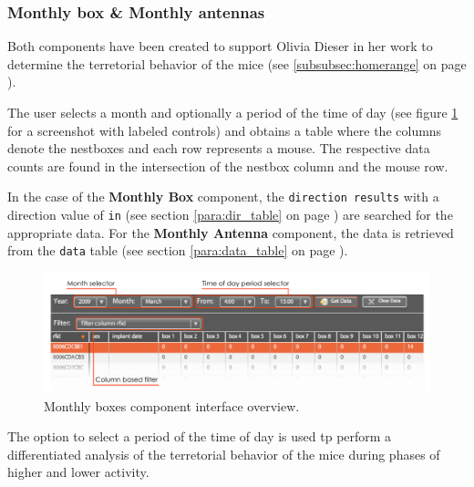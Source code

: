 \subsubsection{Monthly box \& Monthly antennas}
\label{subsubsec:monthbox}

Both components have been created to support Olivia Dieser in her work to determine the terretorial behavior of the mice (see \ref{subsubsec:homerange} on page \pageref{subsubsec:homerange}).

The user selects a month and optionally a period of the time of day (see figure \ref{fig:month_box_ant} for a screenshot with labeled controls) and obtains a table where the columns denote the nestboxes and each row represents a mouse. The respective data counts are found in the intersection of the nestbox column and the mouse row.

In the case of the \textbf{Monthly Box} component, the \lstinline|direction results| with a direction value of \lstinline|in| (see section \ref{para:dir_table} on page \pageref{para:dir_table}) are searched for the appropriate data. For the \textbf{Monthly Antenna} component, the data is retrieved from the \lstinline|data| table (see section \ref{para:data_table} on page \pageref{para:data_table}).

\begin{figure}[htpb]
\begin{center}
  \includegraphics[width=\textwidth]{assets/pdf/month_box_ant.pdf}
  \caption[Monthly boxes component interface]{Monthly boxes component interface overview.}
  \label{fig:month_box_ant}
\end{center}
\end{figure}

The option to select a period of the time of day is used tp perform a differentiated analysis of the terretorial behavior of the mice during phases of higher and lower activity.